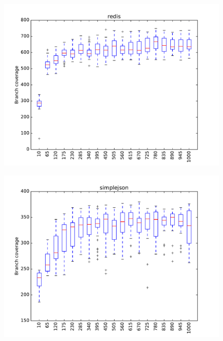 \begin{figure}
\includegraphics[width=\columnwidth]{graphs/redisrand120}
\end{figure}

\begin{figure}
\includegraphics[width=\columnwidth]{graphs/simplejsonrand120}
\end{figure}

